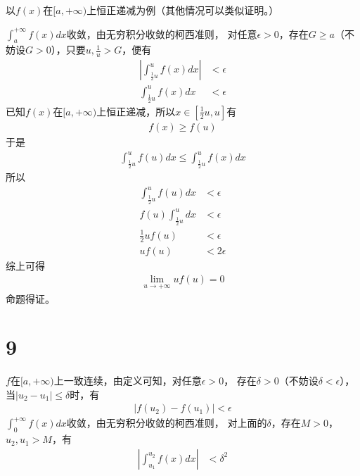 \documentclass{article}
\begin{document}
以$f(x)$在$[a, +\infty)$上恒正递减为例（其他情况可以类似证明。）

$\int_{a}^{+\infty} f(x) dx$收敛，由无穷积分收敛的柯西准则，
对任意$\epsilon > 0$，存在$G \geq a$（不妨设$G > 0$），只要$u, \frac{1}{u} > G$，便有
\begin{align*}
  \left|\int_{\frac{1}{2} u}^{u} f(x) dx \right| & < \epsilon \\
  \int_{\frac{1}{2} u}^{u} f(x) dx               & < \epsilon
\end{align*}
已知$f(x)$在$[a, +\infty)$上恒正递减，所以$x \in [\frac{1}{2}u, u]$有
\begin{align*}
  f(x) \geq f(u)
\end{align*}
于是
\begin{align*}
  \int_{\frac{1}{2} u}^{u} f(u) dx \leq \int_{\frac{1}{2} u}^{u} f(x) dx
\end{align*}
所以
\begin{align*}
  \int_{\frac{1}{2} u}^{u} f(u) dx & < \epsilon   \\
  f(u) \int_{\frac{1}{2} u}^{u} dx & < \epsilon   \\
  \frac{1}{2} u f(u)               & < \epsilon   \\
  u f(u)                           & < 2 \epsilon
\end{align*}
综上可得
\begin{align*}
  \lim \limits_{u \to +\infty} u f(u) = 0
\end{align*}
命题得证。

\section*{9}

$f$在$[a, +\infty)$上一致连续，由定义可知，对任意$\epsilon > 0$，
存在$\delta > 0$（不妨设$\delta < \epsilon$），当$|u_2 - u_1| \leq \delta$时，有
\begin{align*}
  |f(u_2) - f(u_1)| < \epsilon
\end{align*}
$\int_{0}^{+\infty} f(x) dx$收敛，由无穷积分收敛的柯西准则，
对上面的$\delta$，存在$M > 0$，$u_2, u_1 > M$，有
\begin{align*}
  \left|\int_{u_1}^{u_2} f(x) dx \right| & < \delta^2
\end{align*}
\end{document}

